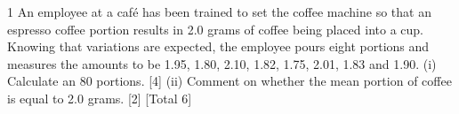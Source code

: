 \documentclass[a4paper,12pt]{article}
\begin{document}
\large 
\noindent


1 An employee at a café has been trained to set the coffee machine so that an espresso
coffee portion results in 2.0 grams of coffee being placed into a cup. Knowing that
variations are expected, the employee pours eight portions and measures the amounts
to be 1.95, 1.80, 2.10, 1.82, 1.75, 2.01, 1.83 and 1.90.
(i) Calculate an 80%
portions. [4]
(ii) Comment on whether the mean portion of coffee is equal to 2.0 grams. [2]
[Total 6]
\end{document}
